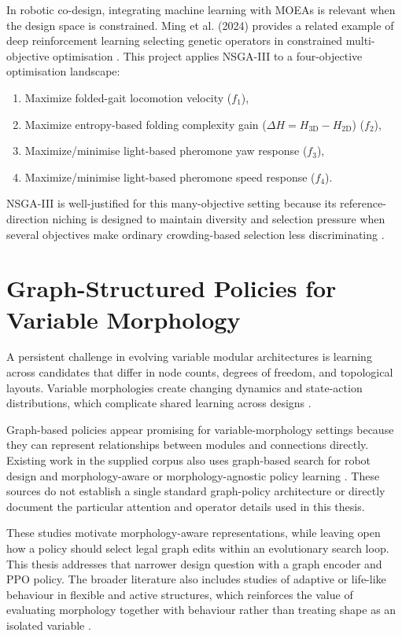 \documentclass[12pt,a4paper]{report}
\begin{document}
In robotic co-design, integrating machine learning with MOEAs is relevant when the design space is constrained. Ming et al. (2024) provides a related example of deep reinforcement learning selecting genetic operators in constrained multi-objective optimisation \citep{ming2024constrained}. This project applies NSGA-III to a four-objective optimisation landscape:
\begin{enumerate}
    \item Maximize folded-gait locomotion velocity ($f_1$),
    \item Maximize entropy-based folding complexity gain ($\Delta H = H_{\text{3D}} - H_{\text{2D}}$) ($f_2$),
    \item Maximize/minimise light-based pheromone yaw response ($f_3$),
    \item Maximize/minimise light-based pheromone speed response ($f_4$).
\end{enumerate}
NSGA-III is well-justified for this many-objective setting because its reference-direction niching is designed to maintain diversity and selection pressure when several objectives make ordinary crowding-based selection less discriminating \citep{deb2014evolutionary}.

\section{Graph-Structured Policies for Variable Morphology}
A persistent challenge in evolving variable modular architectures is learning across candidates that differ in node counts, degrees of freedom, and topological layouts. Variable morphologies create changing dynamics and state-action distributions, which complicate shared learning across designs \citep{sun2023co,li2023modular}.

Graph-based policies appear promising for variable-morphology settings because they can represent relationships between modules and connections directly. Existing work in the supplied corpus also uses graph-based search for robot design and morphology-aware or morphology-agnostic policy learning \citep{xu2021multi,luo2025gcnt,wang2019neural,wang2026evolving}. These sources do not establish a single standard graph-policy architecture or directly document the particular attention and operator details used in this thesis.

These studies motivate morphology-aware representations, while leaving open how a policy should select legal graph edits within an evolutionary search loop. This thesis addresses that narrower design question with a graph encoder and PPO policy. The broader literature also includes studies of adaptive or life-like behaviour in flexible and active structures, which reinforces the value of evaluating morphology together with behaviour rather than treating shape as an isolated variable \citep{wei2026life}.
\end{document}
